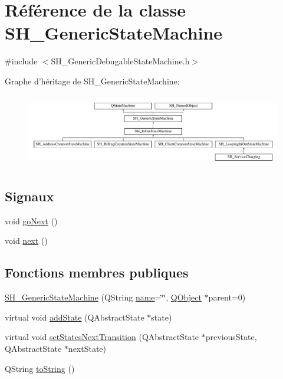 \hypertarget{classSH__GenericStateMachine}{\section{Référence de la classe S\-H\-\_\-\-Generic\-State\-Machine}
\label{classSH__GenericStateMachine}
}


{\ttfamily \#include $<$S\-H\-\_\-\-Generic\-Debugable\-State\-Machine.\-h$>$}

Graphe d'héritage de S\-H\-\_\-\-Generic\-State\-Machine\-:\begin{figure}[H]
\begin{center}
\leavevmode
\includegraphics[height=3.240741cm]{classSH__GenericStateMachine}
\end{center}
\end{figure}
\subsection*{Signaux}
\begin{DoxyCompactItemize}
\item 
void \hyperlink{classSH__GenericStateMachine_aec37e33524182ab83bf300f1cc1a064e}{go\-Next} ()
\item 
void \hyperlink{classSH__GenericStateMachine_af4771d31d87951c997fba1633c2d67f6}{next} ()
\end{DoxyCompactItemize}
\subsection*{Fonctions membres publiques}
\begin{DoxyCompactItemize}
\item 
\hyperlink{classSH__GenericStateMachine_ac34a1ac375e680e27708097c4f099f59}{S\-H\-\_\-\-Generic\-State\-Machine} (Q\-String \hyperlink{classSH__NamedObject_a9f686c6f2a5bcc08ad03d0cee0151f0f}{name}=\char`\"{}\char`\"{}, \hyperlink{classQObject}{Q\-Object} $\ast$parent=0)
\item 
virtual void \hyperlink{classSH__GenericStateMachine_af4402993e916573a589c9d28158b28d8}{add\-State} (Q\-Abstract\-State $\ast$state)
\item 
virtual void \hyperlink{classSH__GenericStateMachine_a136a71cd1f2de1322ac7694db25f0b53}{set\-States\-Next\-Transition} (Q\-Abstract\-State $\ast$previous\-State, Q\-Abstract\-State $\ast$next\-State)
\item 
Q\-String \hyperlink{classSH__GenericStateMachine_a85c0c1c9d258ae991f84667412fa47cd}{to\-String} ()
\end{DoxyCompactItemize}
